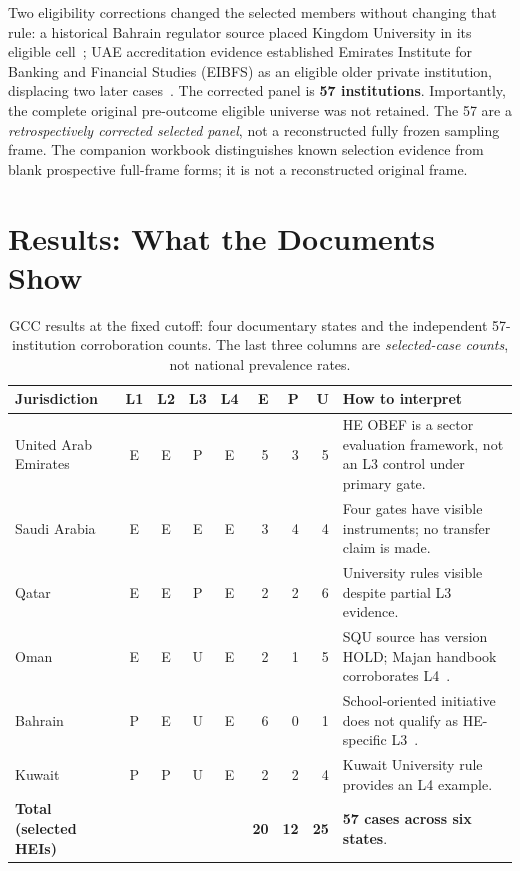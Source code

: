\documentclass[conference,letterpaper]{IEEEtran}
\begin{document}
Two eligibility corrections changed the selected members without changing that rule: a historical Bahrain regulator source placed Kingdom University in its eligible cell~\cite{bqa1,bqa2}; UAE accreditation evidence established Emirates Institute for Banking and Financial Studies (EIBFS) as an eligible older private institution, displacing two later cases~\cite{caa1,caa2}. The corrected panel is \textbf{57 institutions}. Importantly, the complete original pre-outcome eligible universe was not retained. The 57 are a \emph{retrospectively corrected selected panel}, not a reconstructed fully frozen sampling frame. The companion workbook distinguishes known selection evidence from blank prospective full-frame forms; it is not a reconstructed original frame.

\section{Results: What the Documents Show}
\begin{table}[t]
\centering\caption{GCC results at the fixed cutoff: four documentary states and the independent 57-institution corroboration counts. The last three columns are \emph{selected-case counts}, not national prevalence rates.}
\label{tab:core}\small
\setlength{\tabcolsep}{6pt}
\begin{tabularx}{\textwidth}{@{}p{}ccccrrrX@{}}
\toprule
Jurisdiction & L1 & L2 & L3 & L4 & E & P & U & How to interpret\tabularnewline\midrule
United Arab Emirates & E & E & P & E & 5 & 3 & 5 & HE OBEF is a sector evaluation framework, not an L3 control under primary gate.\tabularnewline
Saudi Arabia & E & E & E & E & 3 & 4 & 4 & Four gates have visible instruments; no transfer claim is made.\tabularnewline
Qatar & E & E & P & E & 2 & 2 & 6 & University rules visible despite partial L3 evidence.\tabularnewline
Oman & E & E & U & E & 2 & 1 & 5 & SQU source has version HOLD; Majan handbook corroborates L4~\cite{squ,majanhb}.\tabularnewline
Bahrain & P & E & U & E & 6 & 0 & 1 & School-oriented initiative does not qualify as HE-specific L3~\cite{bahrain}.\tabularnewline
Kuwait & P & P & U & E & 2 & 2 & 4 & Kuwait University rule provides an L4 example.\tabularnewline\midrule
\textbf{Total (selected HEIs)} & & & & & \textbf{20} & \textbf{12} & \textbf{25} & \textbf{57 cases across six states}.\tabularnewline\bottomrule
\end{tabularx}
\end{table}
\end{document}
